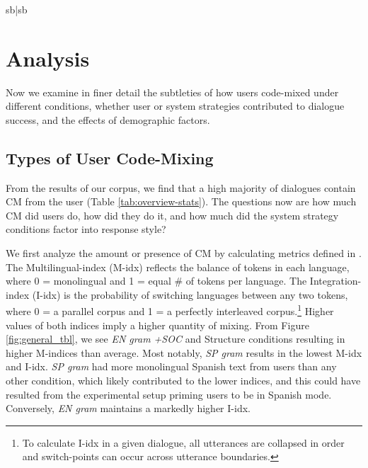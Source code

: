 \documentclass[11pt,a4paper]{article}
\newcommand{\ea}[1]{\textcolor{blue}{\bf\small [#1 --EA]}}
\begin{document}
\begin{table}[t]
\begin{tabularx}{\linewidth}{sb|sb}
\hline
\end{tabularx}
\caption{\label{tab:example-dialogues} Examples of human (H) interactions with 4 different dialogue systems (S).}
\end{table}

\section{Analysis}
\label{sec:analysis}


Now we examine in finer detail the subtleties of how users code-mixed under different conditions, whether user or system strategies contributed to dialogue success, and the effects of demographic factors.

\subsection{Types of User Code-Mixing}
From the results of our corpus, we find that a high majority of dialogues contain CM from the user (Table \ref{tab:overview-stats}).
The questions now are how much CM did users do, how did they do it, and how much did the system strategy conditions factor into response style?

We first analyze the amount or presence of CM by calculating metrics defined in \citet{guzman2017metrics}. 
The Multilingual-index (M-idx) reflects the balance of tokens in each language, where 0 = monolingual and 1 = equal \# of tokens per language. 
The Integration-index (I-idx) is the probability of switching languages between any two tokens, where 0 = a parallel corpus and 1 = a perfectly interleaved corpus.\footnote{To calculate I-idx in a given dialogue, all utterances are collapsed in order and switch-points can occur across utterance boundaries.}
Higher values of both indices imply a higher quantity of mixing. 
From Figure \ref{fig:general_tbl}, we see \textit{EN gram +SOC} and Structure conditions resulting in higher M-indices than average. 
Most notably, \textit{SP gram} results in the lowest M-idx and I-idx. 
\textit{SP gram} had more monolingual Spanish text from users than any other condition, which likely contributed to the lower indices, and this could have resulted from the experimental setup priming users to be in Spanish mode.
Conversely, \textit{EN gram} maintains a markedly higher I-idx. 
\end{document}
